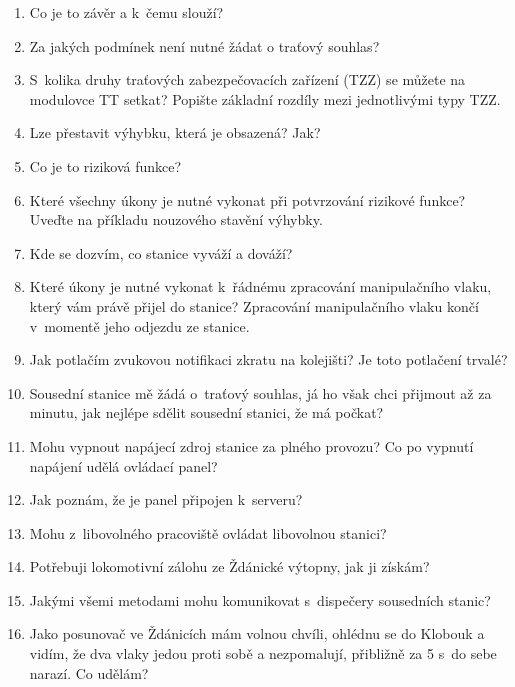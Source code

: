 \documentclass[12pt,a4paper]{article}
\begin{document}
\begin{enumerate}[leftmargin=*]
\item Co je to závěr a k~čemu slouží?

\item Za jakých podmínek není nutné žádat o traťový souhlas?

\item S~kolika druhy traťových zabezpečovacích zařízení (TZZ) se můžete na
modulovce TT setkat? Popište základní rozdíly mezi jednotlivými typy TZZ.

\item Lze přestavit výhybku, která je obsazená? Jak?

\item Co je to riziková funkce?

\item Které všechny úkony je nutné vykonat při potvrzování rizikové funkce?
Uveďte na příkladu nouzového stavění výhybky.

\item Kde se dozvím, co stanice vyváží a dováží?

\item Které úkony je nutné vykonat k~řádnému zpracování manipulačního vlaku,
který vám právě přijel do stanice? Zpracování manipulačního vlaku končí
v~momentě jeho odjezdu ze stanice.

\item Jak potlačím zvukovou notifikaci zkratu na kolejišti? Je toto potlačení
trvalé?

\item Sousední stanice mě žádá o~traťový souhlas, já ho však chci přijmout až
za minutu, jak nejlépe sdělit sousední stanici, že má počkat?

\item Mohu vypnout napájecí zdroj stanice za plného provozu? Co po vypnutí
napájení udělá ovládací panel?

\item Jak poznám, že je panel připojen k~serveru?

\item Mohu z~libovolného pracoviště ovládat libovolnou stanici?

\item Potřebuji lokomotivní zálohu ze Ždánické výtopny, jak ji získám?

\item Jakými všemi metodami mohu komunikovat s~dispečery sousedních stanic?

\item Jako posunovač ve Ždánicích mám volnou chvíli, ohlédnu se do Klobouk a
vidím, že dva vlaky jedou proti sobě a nezpomalují, přibližně za 5 s~do sebe
narazí. Co udělám?


\end{enumerate}
\end{document}
